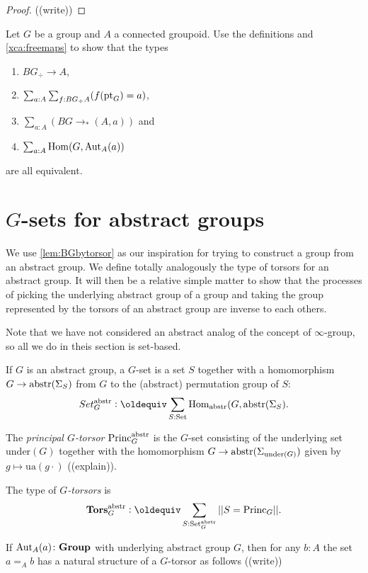 \begin{proof}
  ((write))
\end{proof}

\begin{xca}\label{xca:BGtotype}
  Let $G$ be a group and $A$ a connected groupoid.  Use the definitions and \cref{xca:freemaps} to show that the types
  \begin{enumerate}
  \item $BG_\div\to A$, 
  \item $\sum_{a:A}\sum_{f:BG_\div A}(f({\mathord{\mathrm{pt}}}_G)=a)$, 
  \item $\sum_{a:A}(BG\to_*(A,a))$ and 
  \item $\sum_{a:A}\mathrm{Hom}(G,\mathrm{Aut}_A(a))$
  \end{enumerate}
 are all equivalent.
\end{xca}

\section{$G$-sets for abstract groups}
\label{sec:Gsetforabstract}


We use \cref{lem:BGbytorsor} as our inspiration for trying to construct a group from an abstract group.  We define totally analogously the type of torsors for an abstract group.  It will then be a relative simple matter to show that the processes of picking the underlying abstract group of a group and taking the group represented by the torsors of an abstract group are inverse to each others.

Note that we have not considered an abstract analog of the concept of $\infty$-group, so all we do in theis section is set-based.

\begin{definition}
\label{def:abstrGtorsors}
  If $G$ is an abstract group, a $G$-set is a set $S$ together with a homomorphism
$G\to\mathrm{abstr}(\Sigma_S)$
from $G$ to the (abstract) permutation group of $S$:
$$Set_G^\abstr\defequi \sum_{S:\Set}\Hom_\abstr(G,\abstr(\Sigma_S).$$

The \emph{principal $G$-torsor} $\mathrm{Princ}_G^{\mathrm{abstr}}$ is the $G$-set consisting of the underlying set $\mathrm{under}(G)$ together with the homomorphism $G\to\mathrm{abstr}(\Sigma_{\mathrm{under}(G)})$ given by $g\mapsto \mathrm{ua}(g\cdot)$ ((explain)).

The type of \emph{$G$-torsors} is
$$\typetorsor_G^\abstr\defequi\sum_{S:\Set_G^\abstr}||S=\princ_G||.$$
\end{definition}
\begin{example}
  If $\mathrm{Aut}_A(a)\colon\mathbf{Group}$ with underlying abstract group $G$, then for any $b:A$ the set $a=_Ab$ has a natural structure of a $G$-torsor as follows ((write))
\end{example}

